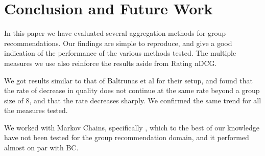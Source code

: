 \section{Conclusion and Future Work}\label{sec:conclusion}
In this paper we have evaluated several aggregation methods for group recommendations. Our findings are simple to reproduce, and give a good indication of the performance of the various methods tested. The multiple measures we use also reinforce the results aside from Rating nDCG.

We got results similar to that of Baltrunas et al for their setup, and found that the rate of decrease in quality does not continue at the same rate beyond a group size of 8, and that the rate decreases sharply. We confirmed the same trend for all the measures tested.

We worked with Markov Chains, specifically \MC, which to the best of our knowledge have not been tested for the group recommendation domain, and it performed almost on par with BC.

%
%
%
%




